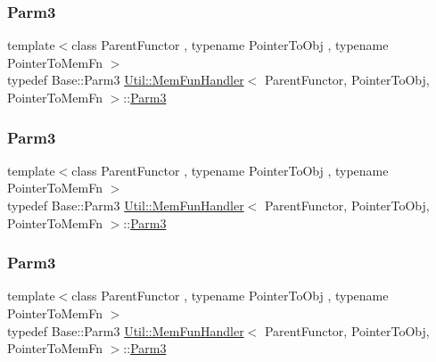 \subsubsection{\texorpdfstring{Parm3}{Parm3}\hspace{0.1cm}{\footnotesize\ttfamily [1/3]}}
{\footnotesize\ttfamily template$<$class Parent\+Functor , typename Pointer\+To\+Obj , typename Pointer\+To\+Mem\+Fn $>$ \\
typedef Base\+::\+Parm3 \mbox{\hyperlink{classUtil_1_1MemFunHandler}{Util\+::\+Mem\+Fun\+Handler}}$<$ Parent\+Functor, Pointer\+To\+Obj, Pointer\+To\+Mem\+Fn $>$\+::\mbox{\hyperlink{classUtil_1_1MemFunHandler_a6cbef94d16f4d6b29d6a8a90afbeff4f}{Parm3}}}

\mbox{\label{classUtil_1_1MemFunHandler_a6cbef94d16f4d6b29d6a8a90afbeff4f}} 
\subsubsection{\texorpdfstring{Parm3}{Parm3}\hspace{0.1cm}{\footnotesize\ttfamily [2/3]}}
{\footnotesize\ttfamily template$<$class Parent\+Functor , typename Pointer\+To\+Obj , typename Pointer\+To\+Mem\+Fn $>$ \\
typedef Base\+::\+Parm3 \mbox{\hyperlink{classUtil_1_1MemFunHandler}{Util\+::\+Mem\+Fun\+Handler}}$<$ Parent\+Functor, Pointer\+To\+Obj, Pointer\+To\+Mem\+Fn $>$\+::\mbox{\hyperlink{classUtil_1_1MemFunHandler_a6cbef94d16f4d6b29d6a8a90afbeff4f}{Parm3}}}

\mbox{\label{classUtil_1_1MemFunHandler_a6cbef94d16f4d6b29d6a8a90afbeff4f}} 
\subsubsection{\texorpdfstring{Parm3}{Parm3}\hspace{0.1cm}{\footnotesize\ttfamily [3/3]}}
{\footnotesize\ttfamily template$<$class Parent\+Functor , typename Pointer\+To\+Obj , typename Pointer\+To\+Mem\+Fn $>$ \\
typedef Base\+::\+Parm3 \mbox{\hyperlink{classUtil_1_1MemFunHandler}{Util\+::\+Mem\+Fun\+Handler}}$<$ Parent\+Functor, Pointer\+To\+Obj, Pointer\+To\+Mem\+Fn $>$\+::\mbox{\hyperlink{classUtil_1_1MemFunHandler_a6cbef94d16f4d6b29d6a8a90afbeff4f}{Parm3}}}

